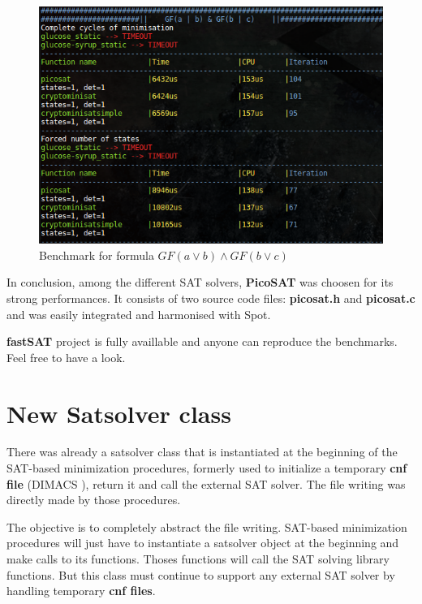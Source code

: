 \begin{figure}[H]
 \centering
 \includegraphics[scale=0.7]{img/satchoose_3.png}
 \caption{Benchmark for formula $GF(a \lor b) \land GF(b \lor c)$}
 \label{fig:satchoose_3}
\end{figure}

\noindent In conclusion, among the different SAT solvers, \textbf{PicoSAT} was choosen for its strong
performances. It consists of two source code files: \textbf{picosat.h} and \textbf{picosat.c} and was
easily integrated and harmonised with Spot.

\textbf{fastSAT}\cite{5} project is fully availlable and anyone can reproduce the benchmarks. Feel free to
have a look.

\section{New Satsolver class}
There was already a satsolver class that is instantiated at the beginning of the SAT-based minimization
procedures, formerly used to initialize a temporary \textbf{cnf file} (DIMACS \cite{18}), return
it and call the external SAT solver. The file writing was directly made by those procedures.

\noindent The objective is to completely abstract the file writing. SAT-based minimization procedures will
just have to instantiate a satsolver object at the beginning and make calls to its functions. Thoses
functions will call the SAT solving library functions. But this class must continue to support any external
SAT solver by handling temporary \textbf{cnf files}.\\

